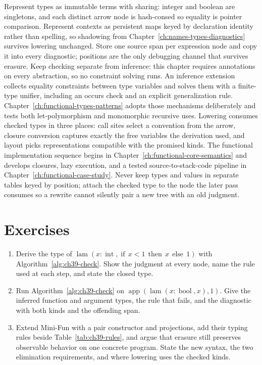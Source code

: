 Represent types as immutable terms with sharing: integer and boolean are singletons, and each distinct arrow node is hash-consed so equality is pointer comparison.
Represent contexts as persistent maps keyed by declaration identity rather than spelling, so shadowing from Chapter~\ref{ch:names-types-diagnostics} survives lowering unchanged.
Store one source span per expression node and copy it into every diagnostic; positions are the only debugging channel that survives erasure.
Keep checking separate from inference: this chapter requires annotations on every abstraction, so no constraint solving runs.
An inference extension collects equality constraints between type variables and solves them with a finite-type unifier, including an occurs check and an explicit generalization rule.
Chapter~\ref{ch:functional-types-patterns} adopts those mechanisms deliberately and tests both let-polymorphism and monomorphic recursive uses.
Lowering consumes checked types in three places: call sites select a convention from the arrow, closure conversion captures exactly the free variables the derivation used, and layout picks representations compatible with the promised kinds.
The functional implementation sequence begins in Chapter~\ref{ch:functional-core-semantics} and develops closures, lazy execution, and a tested source-to-stack-code pipeline in Chapter~\ref{ch:functional-case-study}.
Never keep types and values in separate tables keyed by position; attach the checked type to the node the later pass consumes so a rewrite cannot silently pair a new tree with an old judgment.

\section{Exercises}
\label{sec:ch39-exercises}

\begin{enumerate}
\item Derive the type of $\operatorname{lam}(x : \operatorname{int}, \operatorname{if}\,x < 1\,\operatorname{then}\,x\,\operatorname{else}\,1)$ with Algorithm~\ref{alg:ch39-check}. \label{ex:ch39-derive-if} Show the judgment at every node, name the rule used at each step, and state the closed type.
\item Run Algorithm~\ref{alg:ch39-check} on $\operatorname{app}(\operatorname{lam}(x : \operatorname{bool}, x), 1)$. \label{ex:ch39-call-mismatch} Give the inferred function and argument types, the rule that fails, and the diagnostic with both kinds and the offending span.
\item Extend Mini-Fun with a pair constructor and projections, add their typing rules beside Table~\ref{tab:ch39-rules}, and argue that erasure still preserves observable behavior on one concrete program. \label{ex:ch39-pairs} State the new syntax, the two elimination requirements, and where lowering uses the checked kinds.
\end{enumerate}

